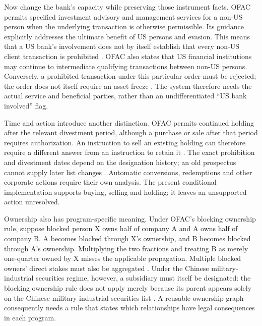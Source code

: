 \documentclass[12pt,a4paper,oneside,openany]{book}
\begin{document}
Now change the bank's capacity while preserving those instrument facts. OFAC
permits specified investment advisory and management services for a non-US
person when the underlying transaction is otherwise permissible. Its guidance
explicitly addresses the ultimate benefit of US persons and evasion. This means
that a US bank's involvement does not by itself establish that every non-US
client transaction is prohibited \citep[FAQ 902]{ofaccmicservices2021}. OFAC also
states that US financial institutions may continue to intermediate qualifying
transactions between non-US persons. Conversely, a prohibited transaction under
this particular order must be rejected; the order does not itself require an
asset freeze \citep[FAQ 1048]{ofaccmicintermediation2022}. The system therefore
needs the actual service and beneficial parties, rather than an undifferentiated
``US bank involved'' flag.

Time and action introduce another distinction. OFAC permits continued holding
after the relevant divestment period, although a purchase or sale after that
period requires authorization. An instruction to sell an existing holding can
therefore require a different answer from an instruction to retain it
\citep[FAQ 1046]{ofaccmicholding2022}. The exact prohibition and divestment dates
depend on the designation history; an old prospectus cannot supply later list
changes \citep[FAQ 899]{ofaccmicdates2021}. Automatic conversions, redemptions
and other corporate actions require their own analysis. The present conditional
implementation supports buying, selling and holding; it leaves an unsupported
action unresolved.

Ownership also has program-specific meaning. Under OFAC's blocking ownership
rule, suppose blocked person X owns half of company A and A owns half of company
B. A becomes blocked through X's ownership, and B becomes blocked through A's
ownership. Multiplying the two fractions and treating B as merely one-quarter
owned by X misses the applicable propagation. Multiple blocked owners' direct
stakes must also be aggregated \citep[FAQ 401, examples 1--3]{ofacownership2014}.
Under the Chinese military-industrial securities regime, however, a subsidiary
must itself be designated: the blocking ownership rule does not apply merely
because its parent appears solely on the Chinese military-industrial securities list
\citep[FAQ 857]{ofaccmicsubs2021}. A reusable ownership graph consequently needs
a rule that states which relationships have legal consequences in each program.
\end{document}

